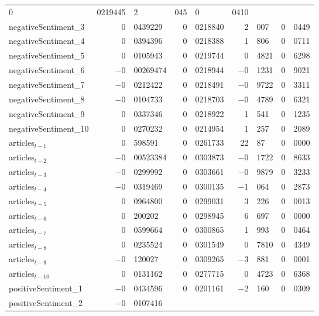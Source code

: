 \begin{center}
\begin{longtable}{lr@{.}lr@{.}lr@{.}lr@{.}l}
    0&0219445 &
        2&045 &
        0&0410 \\
negativeSentiment\_3 &
    0&0439229 &
    0&0218840 &
        2&007 &
        0&0449 \\
negativeSentiment\_4 &
    0&0394396 &
    0&0218388 &
        1&806 &
        0&0711 \\
negativeSentiment\_5 &
    0&0105943 &
    0&0219744 &
        0&4821 &
        0&6298 \\
negativeSentiment\_6 &
    $-$0&00269474 &
    0&0218944 &
        $-$0&1231 &
        0&9021 \\
negativeSentiment\_7 &
    $-$0&0212422 &
    0&0218491 &
        $-$0&9722 &
        0&3311 \\
negativeSentiment\_8 &
    $-$0&0104733 &
    0&0218703 &
        $-$0&4789 &
        0&6321 \\
negativeSentiment\_9 &
    0&0337346 &
    0&0218922 &
        1&541 &
        0&1235 \\
negativeSentiment\_10 &
    0&0270232 &
    0&0214954 &
        1&257 &
        0&2089 \\
articles$_{t-1}$ &
    0&598591 &
    0&0261733 &
        22&87 &
        0&0000 \\
articles$_{t-2}$ &
    $-$0&00523384 &
    0&0303873 &
        $-$0&1722 &
        0&8633 \\
articles$_{t-3}$ &
    $-$0&0299992 &
    0&0303661 &
        $-$0&9879 &
        0&3233 \\
articles$_{t-4}$ &
    $-$0&0319469 &
    0&0300135 &
        $-$1&064 &
        0&2873 \\
articles$_{t-5}$ &
    0&0964800 &
    0&0299031 &
        3&226 &
        0&0013 \\
articles$_{t-6}$ &
    0&200202 &
    0&0298945 &
        6&697 &
        0&0000 \\
articles$_{t-7}$ &
    0&0599664 &
    0&0300865 &
        1&993 &
        0&0464 \\
articles$_{t-8}$ &
    0&0235524 &
    0&0301549 &
        0&7810 &
        0&4349 \\
articles$_{t-9}$ &
    $-$0&120027 &
    0&0309265 &
        $-$3&881 &
        0&0001 \\
articles$_{t-10}$ &
    0&0131162 &
    0&0277715 &
        0&4723 &
        0&6368 \\
positiveSentiment\_1 &
    $-$0&0434596 &
    0&0201161 &
        $-$2&160 &
        0&0309 \\
positiveSentiment\_2 &
    $-$0&0107416 &

\end{longtable}
\end{center}
